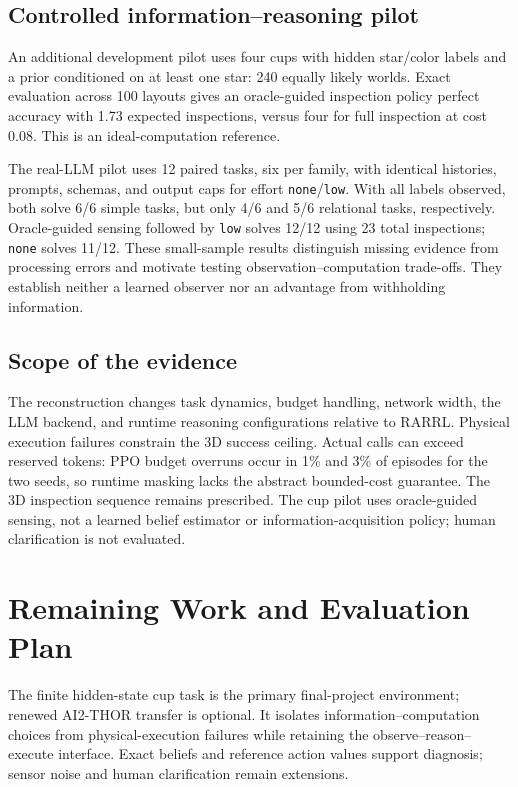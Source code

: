 \documentclass[conference]{IEEEtran}
\begin{document}
\subsection{Controlled information--reasoning pilot}
An additional development pilot uses four cups with hidden star/color labels and a prior conditioned on at least one star: 240 equally likely worlds. Exact evaluation across 100 layouts gives an oracle-guided inspection policy perfect accuracy with 1.73 expected inspections, versus four for full inspection at cost 0.08. This is an ideal-computation reference.

The real-LLM pilot uses 12 paired tasks, six per family, with identical histories, prompts, schemas, and output caps for effort \texttt{none}/\texttt{low}. With all labels observed, both solve 6/6 simple tasks, but only 4/6 and 5/6 relational tasks, respectively. Oracle-guided sensing followed by \texttt{low} solves 12/12 using 23 total inspections; \texttt{none} solves 11/12. These small-sample results distinguish missing evidence from processing errors and motivate testing observation--computation trade-offs. They establish neither a learned observer nor an advantage from withholding information.

\subsection{Scope of the evidence}
The reconstruction changes task dynamics, budget handling, network width, the LLM backend, and runtime reasoning configurations relative to RARRL. Physical execution failures constrain the 3D success ceiling. Actual calls can exceed reserved tokens: PPO budget overruns occur in 1\% and 3\% of episodes for the two seeds, so runtime masking lacks the abstract bounded-cost guarantee. The 3D inspection sequence remains prescribed. The cup pilot uses oracle-guided sensing, not a learned belief estimator or information-acquisition policy; human clarification is not evaluated.

\section{Remaining Work and Evaluation Plan}
The finite hidden-state cup task is the primary final-project environment; renewed AI2-THOR transfer is optional. It isolates information--computation choices from physical-execution failures while retaining the observe--reason--execute interface. Exact beliefs and reference action values support diagnosis; sensor noise and human clarification remain extensions.
\end{document}
